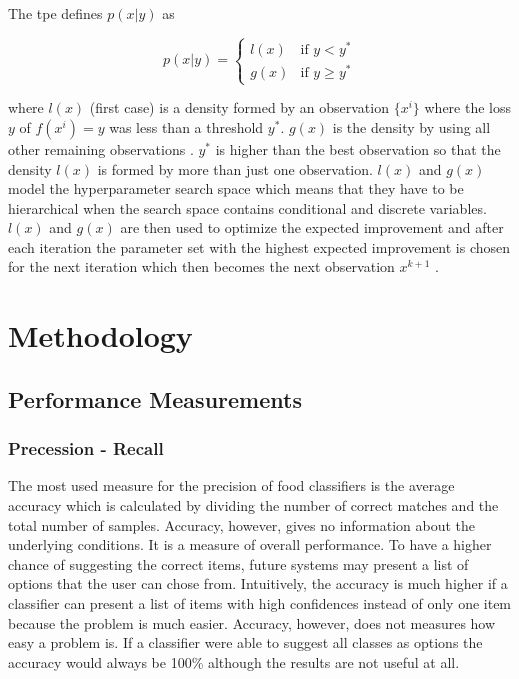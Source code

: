The \gls{tpe} defines $p(x|y)$ as 

\begin{equation}
p(x|y) =
\begin{cases}

l(x) & \text{if } y < y^* \\
g(x) & \text{if } y \geq y^*

\end{cases}
\end{equation}

where $l(x)$ {(first case)} is a density formed by an observation $\{x^i\}$ where the loss $y$ of $f(x^i)=y$ was less than a threshold $y^*$. $g(x)$ is the density by using all other remaining observations \cite{Bergstra2013a}. $y^*$ is higher than the best observation so that the density $l(x)$ is formed by more than just one observation. $l(x)$ and $g(x)$ model the hyperparameter search space which means that they have to be hierarchical when the search space contains conditional and discrete variables. $l(x)$ and $g(x)$ are then used to optimize the expected improvement and after each iteration the parameter set with the highest expected improvement is chosen for the next iteration which then becomes the next observation $x^{k+1}$ \cite{Bergstra2013a}. 
























\section{Methodology}
\subsection{Performance Measurements}

\subsubsection*{Precession - Recall}
The most used measure for the precision of food classifiers is the average accuracy which is calculated by dividing the number of correct matches and the total number of samples. Accuracy, however, gives no information about the underlying conditions. It is a measure of overall performance. To have a higher chance of suggesting the correct items, future systems may present a list of options that the user can chose from. Intuitively, the accuracy is much higher if a classifier can present a list of items with high confidences instead of only one item because the problem is much easier. Accuracy, however, does not measures how easy a problem is. If a classifier were able to suggest all classes as options the accuracy would always be 100\% although the results are not useful at all.

